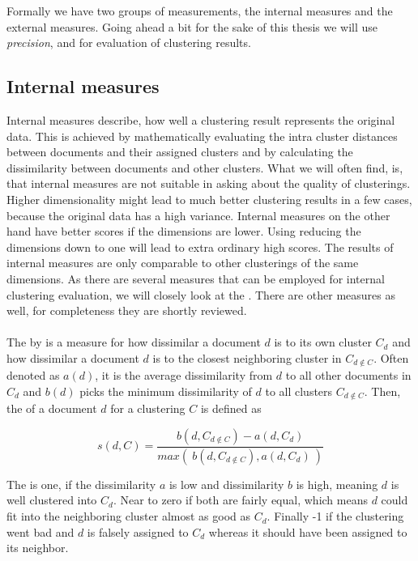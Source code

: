   Formally we have two groups of measurements, the internal measures and the external measures. Going ahead a bit for the sake of this thesis we will use \emph{precision}, \vmeasure{} and \silco{} for evaluation of clustering results.

  \subsection{Internal measures}
  \label{sec:internal_measures}

    Internal measures describe, how well a clustering result represents the original data. This is achieved by mathematically evaluating the intra cluster distances between documents and their assigned clusters and by calculating the dissimilarity between documents and other clusters. What we will often find, is, that internal measures are not suitable in asking about the quality of clusterings. Higher dimensionality might lead to much better clustering results in a few cases, because the original data has a high variance. Internal measures on the other hand have better scores if the dimensions are lower. Using \lsa{} reducing the dimensions down to one will lead to extra ordinary high scores. The results of internal measures are only comparable to other clusterings of the same dimensions. As there are several measures that can be employed for internal clustering evaluation, we will closely look at the \silco{}. There are other measures as well, for completeness they are shortly reviewed.

    \paragraph{} The \textbf{\silco{}} by \cite{Silhouettes1987} is a measure for how dissimilar a document $d$ is to its own cluster $C_d$ and how dissimilar a document $d$ is to the closest neighboring cluster in $C_{d \not \in C}$. Often denoted as $a(d)$, it is the average dissimilarity from $d$ to all other documents in $C_d$ and $b(d)$ picks the minimum dissimilarity of $d$ to all clusters $C_{d \not \in C}$. Then, the \silco{} of a document $d$ for a clustering $C$ is defined as

      \begin{equation}
        s(d, C) = \frac{b(d, C_{d \not \in C}) - a(d, C_d)}{max(\:b(d, C_{d \not \in C}), a(d, C_d)\:)}
      \end{equation} 

    The \silco{} is one, if the dissimilarity $a$ is low and dissimilarity $b$ is high, meaning $d$ is well clustered into $C_d$. Near to zero if both are fairly equal, which means $d$ could fit into the neighboring cluster almost as good as $C_d$. Finally -1 if the clustering went bad and $d$ is falsely assigned to $C_d$ whereas it should have been assigned to its neighbor.


